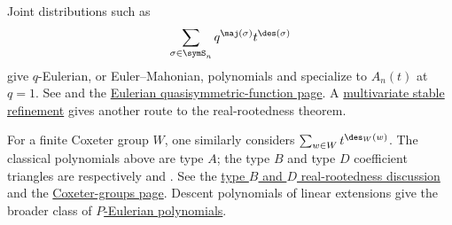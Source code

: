 Joint
distributions such as
\[
 \sum_{\sigma\in\symS_n}q^{\maj(\sigma)}t^{\des(\sigma)}
\]
give $q$-Eulerian, or Euler--Mahonian, polynomials and specialize to $A_n(t)$
at $q=1$.  See \cite{ShareshianWachs2007} and the
\hyperref[eulerianSymmetric]{Eulerian quasisymmetric-function page}.  A
\hyperref[ex:stableMultivariateEulerianOperator]{multivariate stable
refinement} gives another route to the real-rootedness theorem.

For a finite Coxeter group $W$, one similarly considers
$\sum_{w\in W}t^{\des_W(w)}$.  The classical polynomials above are type
$A$; the type $B$ and type $D$ coefficient triangles are respectively
 and .  See the
\hyperref[ex:typeBEulerianSturm]{type $B$ and $D$ real-rootedness discussion}
and the \hyperref[coxeterTypeB]{Coxeter-groups page}.  Descent polynomials of
linear extensions give the broader class of
\hyperref[pEulerianPolynomial]{$P$-Eulerian polynomials}.
